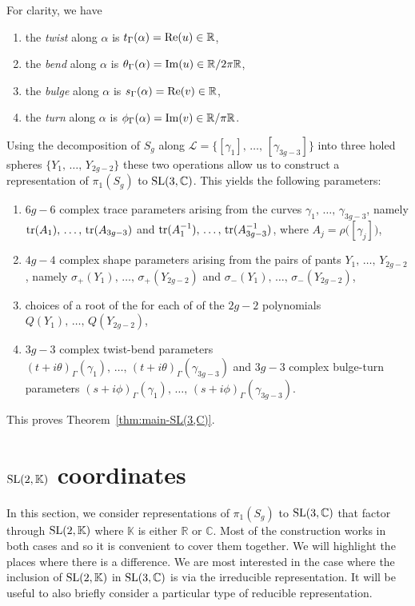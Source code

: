 \documentclass[11pt]{amsart}
\numberwithin{equation}{section}
\begin{document}
For clarity, we have
\begin{enumerate}
\item[(i)] the {\em twist} along $\alpha$ is $t_\Gamma(\alpha)={\rm Re}(u)\in{\mathbb R}$, 
\item[(ii)] the {\em bend} along $\alpha$ is $\theta_\Gamma(\alpha)={\rm Im}(u)\in {\mathbb R}/2\pi{\mathbb R}$,
\item[(iii)] the {\em bulge} along $\alpha$ is $s_\Gamma(\alpha)={\rm Re}(v)\in{\mathbb R}$,
\item[(iv)] the {\em turn} along $\alpha$ is $\phi_\Gamma(\alpha)={\rm Im}(v)\in{\mathbb R}/\pi{\mathbb R}$.
\end{enumerate}


Using the decomposition of $S_g$ along ${\mathcal L}=\{[\gamma_1],\,\ldots,\,[\gamma_{3g-3}]\}$ into three holed spheres
$\{Y_1,\,\ldots,\,Y_{2g-2}\}$ these two operations allow us to construct a representation of $\pi_1(S_g)$ to
${\rm SL}(3,{\mathbb C})$. This yields the following parameters:
\begin{enumerate}
\item[(1)] $6g-6$ complex trace parameters arising from the curves $\gamma_1,\,\ldots,\,\gamma_{3g-3}$, namely 
${\rm tr}(A_1),\,\ldots,\,{\rm tr}(A_{3g-3})$ and 
${\rm tr}(A_1^{-1}),\,\ldots,\,{\rm tr}(A_{3g-3}^{-1})$, where $A_j=\rho\bigl([\gamma_j]\bigr)$, 
\item[(2)] $4g-4$ complex shape parameters arising from the pairs of pants $Y_1,\,\ldots,\, Y_{2g-2}$, namely
$\sigma_+(Y_1),\,\ldots,\,\sigma_+(Y_{2g-2})$ and 
$\sigma_-(Y_1),\,\ldots,\,\sigma_-(Y_{2g-2})$, 
\item[(3)] choices of a root of the for each of of the $2g-2$ polynomials $Q(Y_1),\,\ldots,\,Q(Y_{2g-2})$, 
\item[(4)] $3g-3$ complex twist-bend parameters 
$(t+i\theta)_\Gamma(\gamma_1),\,\ldots,\,(t+i\theta)_\Gamma(\gamma_{3g-3})$ 
and $3g-3$ complex bulge-turn parameters 
$(s+i\phi)_\Gamma(\gamma_1),\,\ldots,\,(s+i\phi)_\Gamma(\gamma_{3g-3})$.
\end{enumerate}

This proves Theorem~\ref{thm:main-SL(3,C)}.


\section{${\rm SL}(2,\mathbb{K})$ coordinates}\label{sec:SL(2,K)}

In this section, we consider representations of $\pi_1(S_g)$ to ${\rm SL}(3,{\mathbb C})$ that factor through 
${\rm SL}(2,{\mathbb K})$ where ${\mathbb K}$ is either
${\mathbb R}$ or ${\mathbb C}$. Most of the construction works in both cases and so it is convenient to cover them
together. We will highlight the places where there is a difference. We are most interested in the case where
the inclusion of ${\rm SL}(2,{\mathbb K})$ in ${\rm SL}(3,{\mathbb C})$ is via the irreducible representation. 
It will be useful to also briefly consider a particular type of reducible representation. 
\end{document}
